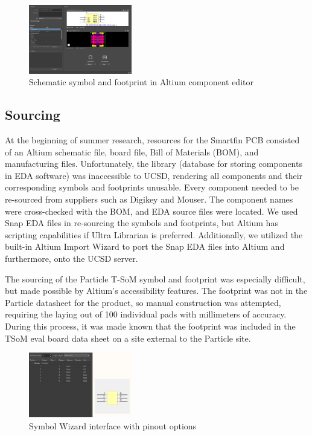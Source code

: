 \documentclass[twocolumn]{article}
\begin{document}
\begin{figure}[ht]
    \centering
    \includegraphics[width=0.4\textwidth]{component example.png}
    \caption{Schematic symbol and footprint in Altium component editor}
    \label{fig:component-editor}
\end{figure}

\subsection{Sourcing}
At the beginning of summer research, resources for the Smartfin PCB consisted of an Altium schematic file, board file, Bill of Materials (BOM), and manufacturing files. Unfortunately, the library (database for storing components in EDA software) was inaccessible to UCSD, rendering all components and their corresponding symbols and footprints unusable. Every component needed to be re-sourced from suppliers such as Digikey\cite{Digikey} and Mouser\cite{Mouser}. The component names were cross-checked with the BOM, and EDA source files were located. We used Snap EDA\cite{SnapEDA} files in re-sourcing the symbols and footprints, but Altium has scripting capabilities if Ultra Librarian\cite{UltraLibrarian} is preferred. Additionally, we utilized the built-in Altium Import Wizard to port the Snap EDA files into Altium and furthermore, onto the UCSD server.

The sourcing of the Particle T-SoM symbol and footprint was especially difficult, but made possible by Altium's accessibility features. The footprint was not in the Particle datasheet for the product, so manual construction was attempted, requiring the laying out of 100 individual pads with millimeters of accuracy. During this process, it was made known that the footprint was included in the TSoM eval board data sheet on a site external to the Particle site.

\begin{figure}[ht]
    \centering
    \includegraphics[width=0.4\textwidth]{symbol wizard.png}
    \caption{Symbol Wizard interface with pinout options}
    \label{fig:symbol-wizard}
\end{figure}
\end{document}
